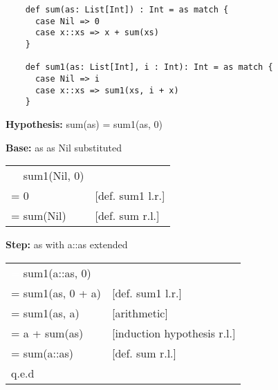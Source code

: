 \documentclass[10pt, a4paper]{article}
\begin{document}
    \begin{verbatim}
    def sum(as: List[Int]) : Int = as match {
      case Nil => 0
      case x::xs => x + sum(xs)
    }

    def sum1(as: List[Int], i : Int): Int = as match {
      case Nil => i
      case x::xs => sum1(xs, i + x)
    }
    \end{verbatim}

    \begin{description} 
        \item \textbf{Hypothesis:} sum(as) = sum1(as, 0)
        \item \textbf{Base:} as as Nil substituted \\
            \begin{tabular}{ l l }
                \textcolor{white}{=} sum1(Nil, 0)     & \\
                = 0                                   & [def. sum1 l.r.] \\
                = sum(Nil)                            & [def. sum r.l.]
            \end{tabular}
        \item \textbf{Step:} as with a::as extended \\
            \begin{tabular}{ l l }
                \textcolor{white}{=} sum1(a::as, 0)    & \\
                = sum1(as, 0 + a)  & [def. sum1 l.r.] \\
                = sum1(as, a)      & [arithmetic] \\
                = a + sum(as)      & [induction hypothesis r.l.] \\
                = sum(a::as)       & [def. sum r.l.] \\
                q.e.d
            \end{tabular}
    \end{description}
\end{document}
